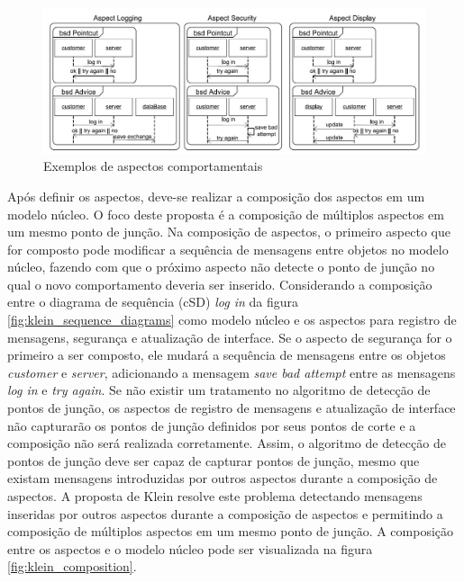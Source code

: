 \begin{figure}
	\centering
	\includegraphics[width=475px]{img/klein_aspects.png}
	\caption{Exemplos de aspectos comportamentais}\label{fig:klein_aspects}
\end{figure}

Após definir os aspectos, deve-se realizar a composição dos aspectos em um modelo núcleo. O foco deste proposta é a composição de múltiplos aspectos
em um mesmo ponto de junção. Na composição de aspectos, o primeiro aspecto que for composto pode modificar a sequência de mensagens entre objetos no
modelo núcleo, fazendo com que o próximo aspecto não detecte o ponto de junção no qual o novo comportamento deveria ser inserido. Considerando a
composição entre o diagrama de sequência (cSD) \textit{log in} da figura \ref{fig:klein_sequence_diagrams} como modelo núcleo e os aspectos para
registro de mensagens, segurança e atualização de interface. Se o aspecto de segurança for o primeiro a ser composto, ele mudará a sequência de
mensagens entre os objetos \textit{customer} e \textit{server}, adicionando a mensagem \textit{save bad attempt} entre as mensagens \textit{log in} e
\textit{try again}. Se não existir um tratamento no algoritmo de detecção de pontos de junção,  os aspectos de registro de mensagens e atualização de
interface não capturarão os pontos de junção definidos por seus pontos de corte e a composição não será realizada corretamente. Assim, o algoritmo de
detecção de pontos de junção deve ser capaz de capturar pontos de junção, mesmo que existam mensagens introduzidas por outros aspectos durante a
composição de aspectos. A proposta de Klein resolve este problema detectando mensagens inseridas por outros aspectos durante a composição
de aspectos e permitindo a composição de múltiplos aspectos em um mesmo ponto de junção. A composição entre os aspectos e o modelo núcleo pode ser
visualizada na figura \ref{fig:klein_composition}.

